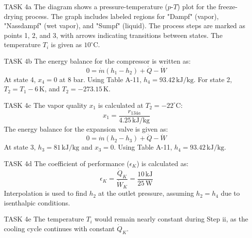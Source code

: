 TASK 4a  
The diagram shows a pressure-temperature (\( p \)-\( T \)) plot for the freeze-drying process. The graph includes labeled regions for "Dampf" (vapor), "Nassdampf" (wet vapor), and "Sumpf" (liquid). The process steps are marked as points 1, 2, and 3, with arrows indicating transitions between states. The temperature \( T_i \) is given as \( 10^\circ\text{C} \).  

TASK 4b  
The energy balance for the compressor is written as:  
\[
0 = \dot{m}(h_1 - h_2) + \dot{Q} - \dot{W}
\]  
At state 4, \( x_4 = 0 \) at 8 bar. Using Table A-11, \( h_4 = 93.42 \, \text{kJ/kg} \).  
For state 2, \( T_2 = T_1 - 6 \, \text{K} \), and \( T_2 = -273.15 \, \text{K} \).  

TASK 4c  
The vapor quality \( x_1 \) is calculated at \( T_2 = -22^\circ\text{C} \):  
\[
x_1 = \frac{r_{134a}}{4.25 \, \text{kJ/kg}}
\]  
The energy balance for the expansion valve is given as:  
\[
0 = \dot{m}(h_2 - h_3) + \dot{Q} - \dot{W}
\]  
At state 3, \( h_3 = 81 \, \text{kJ/kg} \) and \( x_3 = 0 \). Using Table A-11, \( h_4 = 93.42 \, \text{kJ/kg} \).  

TASK 4d  
The coefficient of performance (\( \epsilon_K \)) is calculated as:  
\[
\epsilon_K = \frac{\dot{Q}_K}{\dot{W}_K} = \frac{10 \, \text{kJ}}{25 \, \text{W}}
\]  
Interpolation is used to find \( h_2 \) at the outlet pressure, assuming \( h_2 = h_4 \) due to isenthalpic conditions.  

TASK 4e  
The temperature \( T_i \) would remain nearly constant during Step ii, as the cooling cycle continues with constant \( \dot{Q}_K \).